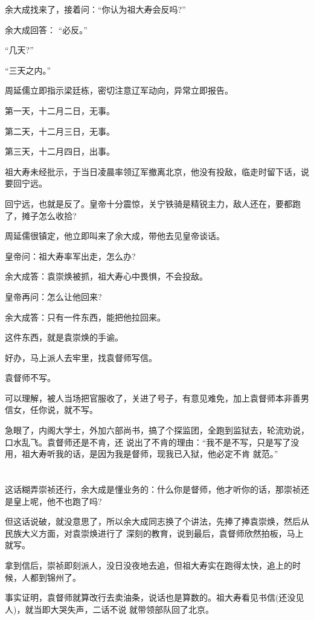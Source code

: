 \documentclass[11pt,a4paper,onecolumn]{article}
\begin{document}
余大成找来了，接着问：``你认为祖大寿会反吗?''

余大成回答： ``必反。''

``几天?''

``三天之内。''

周延儒立即指示梁廷栋，密切注意辽军动向，异常立即报告。

第一天，十二月二日，无事。

第二天，十二月三日，无事。

第三天，十二月四日，出事。

祖大寿未经批示，于当日凌晨率领辽军撤离北京，他没有投敌，临走时留下话，说要回宁远。

回宁远，也就是反了。皇帝十分震惊，关宁铁骑是精锐主力，敌人还在，要都跑了，摊子怎么收拾?

周延儒很镇定，他立即叫来了余大成，带他去见皇帝谈话。

皇帝问：祖大寿率军出走，怎么办?

余大成答：袁崇焕被抓，祖大寿心中畏惧，不会投敌。

皇帝再问：怎么让他回来?

余大成答：只有一件东西，能把他拉回来。

这件东西，就是袁崇焕的手谕。

好办，马上派人去牢里，找袁督师写信。

袁督师不写。

可以理解，被人当场把官服收了，关进了号子，有意见难免，加上袁督师本非善男信女，任你说，就不写。

急眼了，内阁大学士，外加六部尚书，搞了个探监团，全跑到监狱去，轮流劝说，口水乱飞。袁督师还是不肯，还
说出了不肯的理由：``我不是不写，只是写了没用，祖大寿听我的话，是因为我是督师，现我已入狱，他必定不肯
就范。''

\section[\thesection]{}

这话糊弄崇祯还行，余大成是懂业务的：什么你是督师，他才听你的话，那崇祯还是皇上呢，他不也跑了吗?

但这话说破，就没意思了，所以余大成同志换了个讲法，先捧了捧袁崇焕，然后从民族大义方面，对袁崇焕进行了
深刻的教育，说到最后，袁督师欣然拍板，马上就写。

拿到信后，崇祯即刻派人，没日没夜地去追，但祖大寿实在跑得太快，追上的时候，人都到锦州了。

事实证明，袁督师就算改行去卖油条，说话也是算数的。祖大寿看见书信(还没见人)，就当即大哭失声，二话不说
就带领部队回了北京。
\end{document}

